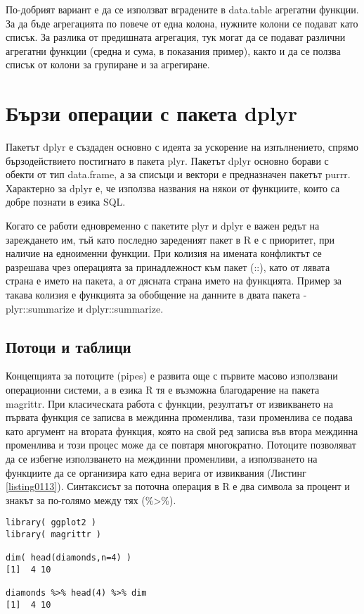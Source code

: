 По-добрият вариант е да се използват вградените в data.table агрегатни функции. За да бъде агрегацията по повече от една колона,  нужните колони се подават като списък. За разлика от предишната агрегация, тук могат да се подават различни агрегатни функции (средна и сума, в показания пример), както и да се ползва списък от колони за групиране и за агрегиране.

\section{Бързи операции с пакета dplyr}

Пакетът dplyr е създаден основно с идеята за ускорение на изпълнението, спрямо бързодействието постигнато в пакета plyr. Пакетът dplyr основно борави с обекти от тип data.frame, а за списъци и вектори е предназначен пакетът purrr. Характерно за dplyr е, че използва названия на някои от функциите, които са добре познати в езика SQL.

Когато се работи едновременно с пакетите plyr и dplyr е важен редът на зареждането им, тъй като последно зареденият пакет в R е с приоритет, при наличие на едноименни функции. При колизия на имената конфликтът се разрешава чрез операцията за принадлежност към пакет (::), като от лявата страна е името на пакета, а от дясната страна името на функцията. Пример за такава колизия е функцията за обобщение на данните в двата пакета - plyr::summarize и dplyr::summarize.

\subsection{Потоци и таблици}

Концепцията за потоците (pipes) е развита още с първите масово използвани операционни системи, а в езика R тя е възможна благодарение на пакета magrittr. При класическата работа с функции, резултатът от извикването на първата функция се записва в междинна променлива, тази променлива се подава като аргумент на втората функция, която на свой ред записва във втора междинна променлива и този процес може да се повтаря многократно. Потоците позволяват да се избегне използването на междинни променливи, а използването на функциите да се организира като една верига от извиквания (Листинг \ref{listing0113}). Синтаксисът за поточна операция в R е два символа за процент и знакът за по-голямо между тях (\%>\%).

\begin{lstlisting}[caption=Поточни операции, label=listing0113]
library( ggplot2 )
library( magrittr )
 
dim( head(diamonds,n=4) )
[1]  4 10
 
diamonds %>% head(4) %>% dim
[1]  4 10
\end{lstlisting}

